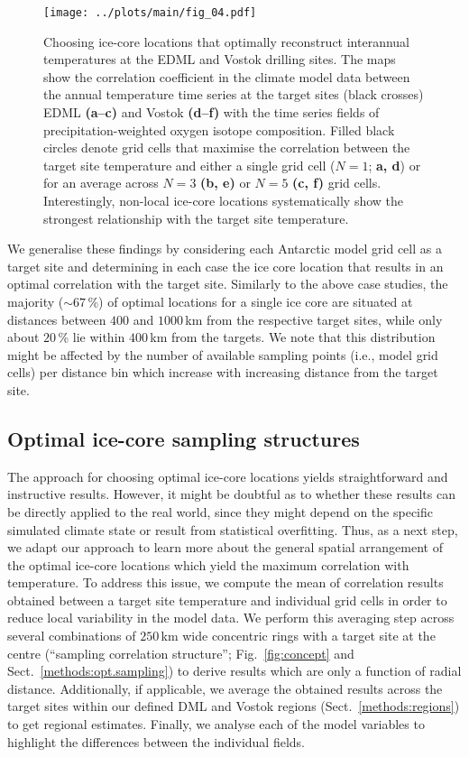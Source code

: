 \documentclass[cp, manuscript]{copernicus}
\begin{document}
\begin{figure*}[t]%
\centering
\texttt{[image: ../plots/main/fig\_04.pdf]}
\caption[Picking optimal sites]{%
  Choosing ice-core locations that optimally reconstruct interannual
  temperatures at the EDML and Vostok drilling sites. The maps show the
  correlation coefficient in the climate model data between the annual
  temperature time series at the target sites (black crosses) EDML
  \textbf{(a--c)} and Vostok \textbf{(d--f)} with the time series fields of
  precipitation-weighted oxygen isotope composition. Filled black circles denote
  grid cells that maximise the correlation between the target site temperature
  and either a single grid cell ($N=1$; \textbf{a, d}) or for an average across
  $N=3$ \textbf{(b, e)} or $N=5$ \textbf{(c, f)} grid cells. Interestingly,
  non-local ice-core locations systematically show the strongest relationship
  with the target site temperature.}
\label{fig:picking}%
\end{figure*}%

We generalise these findings by considering each Antarctic model grid cell as a
target site and determining in each case the ice core location that results in
an optimal correlation with the target site. Similarly to the above case
studies, the majority ($\sim67$\,\%) of optimal locations for a single ice core
are situated at distances between $400$ and $1000$\,km from the respective
target sites, while only about $20$\,\% lie within $400$\,km from the
targets. We note that this distribution might be affected by the number of
available sampling points (i.e., model grid cells) per distance bin which
increase with increasing distance from the target site.

\subsection{Optimal ice-core sampling structures}
\label{results:optim-spacing}

The approach for choosing optimal ice-core locations yields straightforward and
instructive results. However, it might be doubtful as to whether these results
can be directly applied to the real world, since they might depend on the
specific simulated climate state or result from statistical overfitting. Thus,
as a next step, we adapt our approach to learn more about the general spatial
arrangement of the optimal ice-core locations which yield the maximum
correlation with temperature. To address this issue, we compute the mean of
correlation results obtained between a target site temperature and individual
grid cells in order to reduce local variability in the model data. We perform
this averaging step across several combinations of $250$\,km wide concentric
rings with a target site at the centre (``sampling correlation structure'';
Fig.~\ref{fig:concept} and Sect.~\ref{methods:opt.sampling}) to derive
results which are only a function of radial distance. Additionally, if
applicable, we average the obtained results across the target sites within our
defined DML and Vostok regions (Sect.~\ref{methods:regions}) to get regional
estimates. Finally, we analyse each of the model variables to highlight the
differences between the individual fields.
\end{document}
